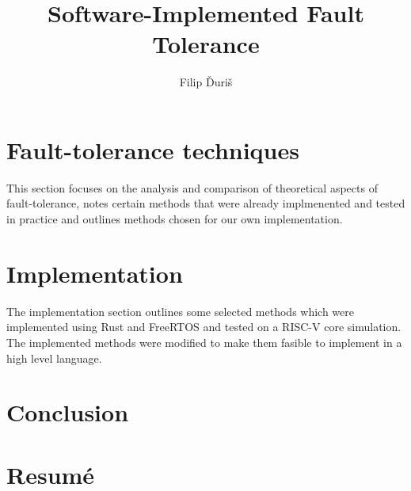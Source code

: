 \documentclass[12pt, letterpaper]{article}
\title{
    \Huge \textbf{Software-Implemented Fault Tolerance}
}
\author{Filip Ďuriš}
\begin{document}

\newpage



\tableofcontents
\newpage


\newpage




\newpage


\newpage



\section{Fault-tolerance techniques}

This section focuses on the analysis and comparison of theoretical aspects of fault-tolerance, notes certain methods that were already implmenented and tested in practice and outlines methods chosen for our own implementation.







\clearpage


\clearpage

\clearpage
\section{Implementation}

The implementation section outlines some selected methods which were implemented using Rust and FreeRTOS and tested on a RISC-V core simulation. The implemented methods were modified to make them fasible to implement in a high level language.


\clearpage


\clearpage


\clearpage



\clearpage


\clearpage
\section{Conclusion}


\clearpage
\section{Resumé}

\newpage
\printbibliography
\end{document}
